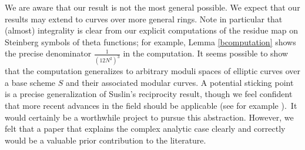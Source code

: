 \documentclass[12pt,amstex,amssymb]{article}
\theoremstyle{plain}
\newtheorem{theorem}{Theorem}[subsection]
\theoremstyle{definition}
\def\lra{\longrightarrow}
\def\Z{{\mathbb Z}}
\def\A{{\mathbb A}}
\def\N{{\mathbb N}}
\def\Q{{\mathbb Q}}
\newcommand{\GL}{\operatorname{GL}}
\begin{document}
\vspace{1em}
We are aware that our result is not the most general possible.  We expect that our results may extend to curves over more general rings.
Note in particular that (almost) integrality is clear from our explicit computations of the residue map on Steinberg symbols of theta functions; for example, Lemma \ref{bcomputation} shows the precise denominator $\frac{1}{(12N^2)^3}$ in the computation. 
It seems possible to show that the computation generalizes to arbitrary moduli spaces of elliptic curves over a base scheme $S$ and their associated modular curves.
A potential sticking point is a precise generalization of Suslin's reciprocity result, though we feel confident that more recent advances in the field should be applicable (see for example \cite{Kriz}).\
It would certainly be a worthwhile project to pursue this abstraction.  However, we felt that a paper that explains the complex analytic case clearly and correctly would be a valuable prior contribution to the literature.
%
%
%
\end{document}
